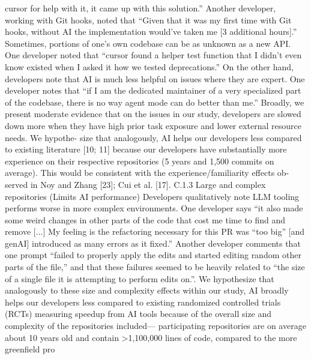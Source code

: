 cursor for help with it, it came up with this solution.” Another developer, working with Git hooks,
noted that “Given that it was my first time with Git hooks, without AI the implementation would’ve
taken me [3 additional hours].” Sometimes, portions of one’s own codebase can be as unknown as
a new API. One developer noted that “cursor found a helper test function that I didn’t even know
existed when I asked it how we tested deprecations.”
On the other hand, developers note that AI is much less helpful on issues where they are expert. One
developer notes that “if I am the dedicated maintainer of a very specialized part of the codebase,
there is no way agent mode can do better than me.”
Broadly, we present moderate evidence that on the issues in our study, developers are slowed down
more when they have high prior task exposure and lower external resource needs. We hypothe-
size that analogously, AI helps our developers less compared to existing literature [10; 11] because
our developers have substantially more experience on their respective repositories (5 years and
1,500 commits on average). This would be consistent with the experience/familiarity effects ob-
served in Noy and Zhang [23]; Cui et al. [17].
C.1.3
Large and complex repositories (Limits AI performance)
Developers qualitatively note LLM tooling performs worse in more complex environments. One
developer says “it also made some weird changes in other parts of the code that cost me time to
find and remove [...] My feeling is the refactoring necessary for this PR was “too big” [and genAI]
introduced as many errors as it fixed.” Another developer comments that one prompt “failed to
properly apply the edits and started editing random other parts of the file,” and that these failures
seemed to be heavily related to “the size of a single file it is attempting to perform edits on.”.
We hypothesize that analogously to these size and complexity effects within our study, AI broadly
helps our developers less compared to existing randomized controlled trials (RCTs) measuring
speedup from AI tools because of the overall size and complexity of the repositories included—
participating repositories are on average about 10 years old and contain >1,100,000 lines of code,
compared to the more greenfield pro

